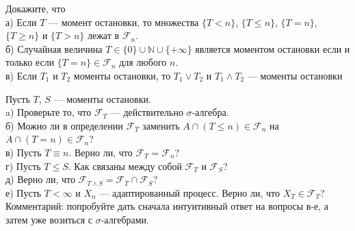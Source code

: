 \begin{problem}
 Докажите, что \\
а) Если $T$ — момент остановки, то множества $\{T<n\}$, $\{T\le
n\}$, $\{T=n\}$, $\{T\ge n\}$ и $\{T>n\}$ лежат в
$\mathcal{F}_{n}$. \\
б) Случайная величина $T\in \{0\}\cup \mathbb{N}\cup \{+\infty\}$
является моментом остановки если и только если $\{T=n\}\in
\mathcal{F}_{n}$ для любого $n$. \\
в) Если $T_{1}$ и $T_{2}$ моменты остановки, то $T_{1}\vee T_{2}$
и $T_{1}\wedge T_{2}$ — моменты остановки

\begin{sol}

\end{sol}
\end{problem}

\begin{problem}
 Пусть $T$, $S$ — моменты остановки. \\
a) Проверьте то, что $\mathcal{F}_{T}$ — действительно
$\sigma$-алгебра. \\
б) Можно ли в определении $\mathcal{F}_{T}$ заменить $A\cap (T\le
n)\in \mathcal{F}_{n}$ на $A\cap (T=n)\in
\mathcal{F}_{n}$? \\
в) Пусть $T\equiv n$. Верно ли, что
$\mathcal{F}_{T}=\mathcal{F}_{n}$? \\
г) Пусть $T\le S$. Как связаны между собой $\mathcal{F}_{T}$ и
$\mathcal{F}_{S}$? \\
д) Верно ли, что $\mathcal{F}_{T\wedge S}=\mathcal{F}_{T}\cap
\mathcal{F}_{S}$? \\
е) Пусть $T<\infty$ и $X_{n}$ — адаптированный процесс. Верно
ли, что $X_{T}\in \mathcal{F}_{T}$? \\
Комментарий: попробуйте дать сначала интуитивный ответ на вопросы
в-е, а затем уже возиться с $\sigma$-алгебрами.

\begin{sol}

\end{sol}
\end{problem}

